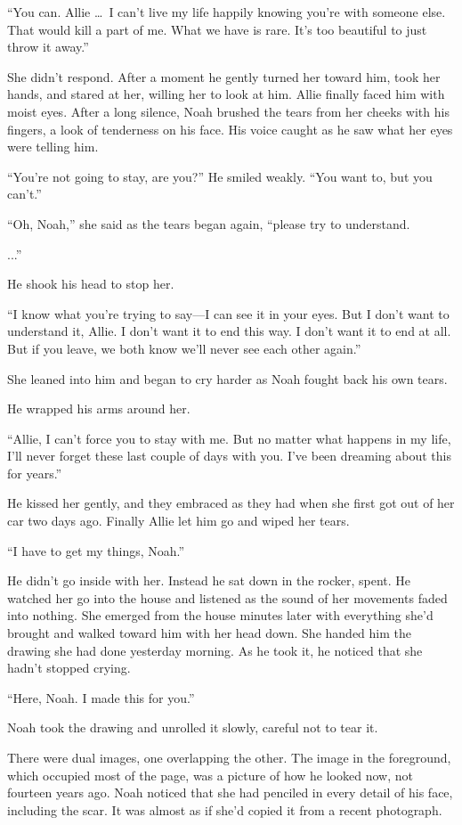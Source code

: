 \documentclass[10pt, twoside, openright]{book}
\begin{document}
``You can. Allie   \dots\ I can't live my life happily knowing you're with
someone else. That would kill a part of me. What we have is rare. It's
too beautiful to just throw it away.''

She didn't respond. After a moment he gently turned her toward him, took
her hands, and stared at her, willing her to look at him. Allie finally
faced him with moist eyes. After a long silence, Noah brushed the tears
from her cheeks with his fingers, a look of tenderness on his face. His
voice caught as he saw what her eyes were telling him.

``You're not going to stay, are you?'' He smiled weakly. ``You want to,
but you can't.''


``Oh, Noah,'' she said as the tears began again, ``please try to
understand.


...''


He shook his head to stop her.


``I know what you're trying to say---I can see it in your eyes. But I
don't want to understand it, Allie. I don't want it to end this way. I
don't want it to end at all. But if you leave, we both know we'll never
see each other again.''

She leaned into him and began to cry harder as Noah fought back his own
tears.


He wrapped his arms around her.


``Allie, I can't force you to stay with me. But no matter what happens
in my life, I'll never forget these last couple of days with you. I've
been dreaming about this for years.''

He kissed her gently, and they embraced as they had when she first got
out of her car two days ago. Finally Allie let him go and wiped her
tears.


``I have to get my things, Noah.''


He didn't go inside with her. Instead he sat down in the rocker, spent.
He watched her go into the house and listened as the sound of her
movements faded into nothing. She emerged from the house minutes later
with everything she'd brought and walked toward him with her head down.
She handed him the drawing she had done yesterday morning. As he took
it, he noticed that she hadn't stopped crying.


``Here, Noah. I made this for you.''

Noah took the drawing and unrolled it slowly, careful not to tear it.


There were dual images, one overlapping the other. The image in the
foreground, which occupied most of the page, was a picture of how he
looked now, not fourteen years ago. Noah noticed that she had penciled
in every detail of his face, including the scar. It was almost as if
she'd copied it from a recent photograph.
\end{document}
